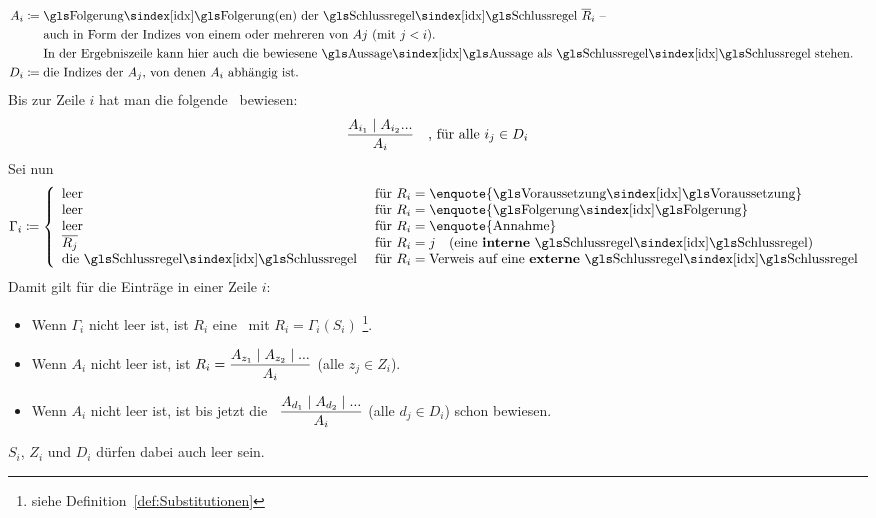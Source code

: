 {\begin{align}
	\\
	A_i & \defeq \text{\Folgerung(en) der \Schlussregel\ $\overline{R}_i$ --}\\
	& \quad\;\; \text{auch in Form der Indizes von einem oder mehreren von $Aj$ (mit $j < i$).}\\
	& \quad\;\; \text{In der Ergebniszeile kann hier auch die bewiesene \Aussage\ als \Schlussregel\ stehen.}
	\\
	D_i & \defeq \text{die Indizes der $A_j$, von denen $A_i$ abhängig ist.}
\end{align}
Bis zur Zeile $i$ hat man die folgende \Schlussregel\ bewiesen:
\[ \frac{A_{i_1} \mid A_{i_2} ...}{A_i} \quad \text{, für alle } i_j \in D_i \]
Sei nun
\[
	\Gamma_i \defeq
	\left\{
		\begin{array}{ll}
			\text{leer}    & \text{ für } R_i = \text{\enquote{\Voraussetzung}} \\
			\text{leer}    & \text{ für } R_i = \text{\enquote{\Folgerung}}     \\
			\text{leer}    & \text{ für } R_i = \text{\enquote{Annahme}}        \\
			\overline{R_j} & \text{ für } R_i = j \quad \text{(eine \defn{interne} \Schlussregel)} \\
			\text{die \Schlussregel} & \text{ für } R_i = \text{Verweis auf eine \defn{externe} \Schlussregel}
		\end{array}
	\right.
\]
Damit gilt für die Einträge in einer Zeile $i$:
\begin{itemize}
	\item Wenn $\Gamma_i$ nicht leer ist, ist $R_i$ eine \Schlussregel\ mit $R_i = \Gamma_i(S_i)$%
	\footnote{%
		siehe Definition~\eqref{def:Substitutionen} 
	}.
	\item Wenn $A_i$ nicht leer ist, ist $R_i = \dfrac{A_{z_1} \mid A_{z_2} \mid ...}{A_i}$ (alle $z_j \in Z_i$).
	\item Wenn $A_i$ nicht leer ist, ist bis jetzt die \Schlussregel\ $\dfrac{A_{d_1} \mid A_{d_2} \mid ...}{A_i}$ (alle $d_j \in D_i$) schon bewiesen.
\end{itemize}
$S_i$, $Z_i$ und $D_i$ dürfen dabei auch leer sein.

}
